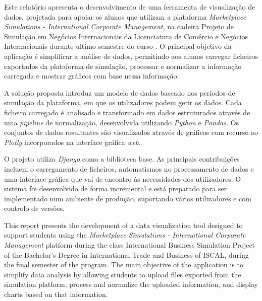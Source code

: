 




Este  relatório apresenta o desenvolvimento de uma ferramenta de visualização de dados, projetada para apoiar os alunos que utilizam a plataforma \textit{Marketplace Simulations - International Corporate Management}, na cadeira Projeto de Simulação em Negócios Internacionais da Licenciatura de Comércio e Negócios Internacionais \cite{FUC_ISCAL_2025} durante ultimo semestre do curso . O principal objetivo da aplicação é simplificar a análise de dados, permitindo aos alunos carregar ficheiros exportados da plataforma de simulação, processar e normalizar a informação carregada e mostrar gráficos com base nessa informação.

A solução proposta introduz um modelo de dados baseado nos períodos de simulação da plataforma, em que os utilizadores podem gerir os dados. Cada ficheiro carregado é analisado e transformado em dados estruturados através de uma \textit{pipeline} de normalização, desenvolvida utilizando \textit{Python} e \textit{Pandas}. Os conjuntos de dados resultantes são visualizados através de gráficos com recurso ao \textit{Plotly} incorporados na interface gráfica \textit{web}.

O projeto utiliza \textit{Django} como a biblioteca base. As principais contribuições incluem o carregamento de ficheiros, automatismos no processamento de dados e uma interface gráfica que vai de encontro às necessidades dos utilizadores. O sistema foi desenvolvido de forma incremental e está preparado para ser implementado num ambiente de produção, suportando vários utilizadores e com controlo de versões.



This report presents the development of a data visualization tool designed to support students using the \textit{Marketplace Simulations - International Corporate Management} platform during the class International Business Simulation Project \cite{FUC_ISCAL_2025} of the Bachelor's Degree in International Trade and Business of ISCAL, during the final semester of the program. The main objective of the application is to simplify data analysis by allowing students to upload files exported from the simulation platform, process and normalize the uploaded information, and display charts based on that information.

